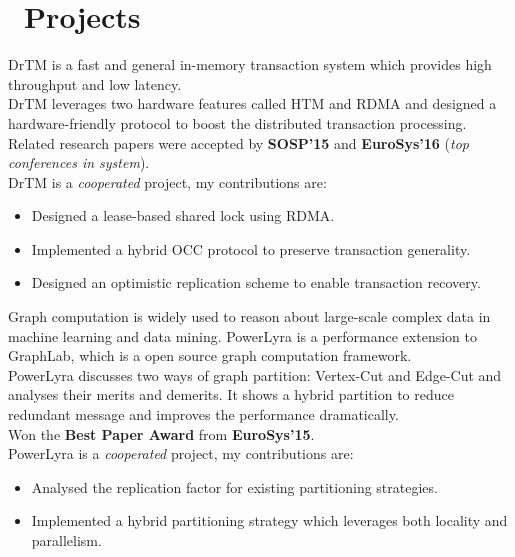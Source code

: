 \documentclass{resume}
\begin{document}
\section{\faUsers\ Projects}
DrTM is a fast and general in-memory transaction system which provides high throughput and low latency.
\\[5pt]
DrTM leverages two hardware features called HTM and RDMA and designed a hardware-friendly protocol to boost the distributed transaction processing.
\\[5pt]
Related research papers were accepted by \textbf{SOSP’15} and \textbf{EuroSys’16} (\emph{top conferences in system}).
\\[5pt]
DrTM is a \textit{cooperated} project, my contributions are:
\begin{itemize}[leftmargin=*]
  \item {Designed a lease-based shared lock using RDMA.}
  \item {Implemented a hybrid OCC protocol to preserve transaction generality.}
  \item {Designed an optimistic replication scheme to enable transaction recovery.}
\end{itemize}

Graph computation is widely used to reason about large-scale complex data in machine learning and data mining. PowerLyra is a performance extension to GraphLab, which is a open source graph computation framework.
\\[5pt]
PowerLyra discusses two ways of graph partition: Vertex-Cut and Edge-Cut and analyses their merits and demerits. It shows a hybrid partition to reduce redundant message and improves the performance dramatically.
\\[5pt]
Won the \textbf{Best Paper Award} from \textbf{EuroSys'15}.
\\[5pt]
PowerLyra is a \textit{cooperated} project, my contributions are:
\begin{itemize}[leftmargin=*]
  \item {Analysed the replication factor for existing partitioning strategies.}
  \item {Implemented a hybrid partitioning strategy which leverages both locality and parallelism.}
\end{itemize}
\end{document}
